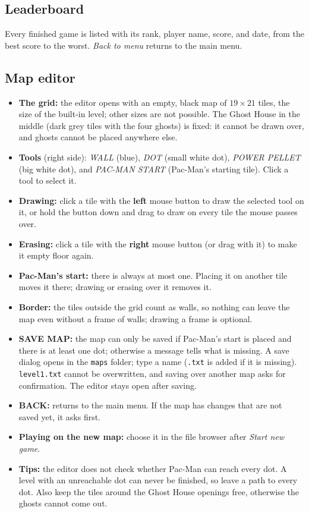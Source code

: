 \documentclass[11pt, a4paper]{article}
\begin{document}
\subsection*{Leaderboard}
Every finished game is listed with its rank, player name, score, and date, from the best score to the worst. \textit{Back to menu} returns to the main menu.

\subsection*{Map editor}
\begin{itemize}
    \item \textbf{The grid:} the editor opens with an empty, black map of $19 \times 21$ tiles, the size of the built-in level; other sizes are not possible. The Ghost House in the middle (dark grey tiles with the four ghosts) is fixed: it cannot be drawn over, and ghosts cannot be placed anywhere else.
    \item \textbf{Tools} (right side): \textit{WALL} (blue), \textit{DOT} (small white dot), \textit{POWER PELLET} (big white dot), and \textit{PAC-MAN START} (Pac-Man's starting tile). Click a tool to select it.
    \item \textbf{Drawing:} click a tile with the \textbf{left} mouse button to draw the selected tool on it, or hold the button down and drag to draw on every tile the mouse passes over.
    \item \textbf{Erasing:} click a tile with the \textbf{right} mouse button (or drag with it) to make it empty floor again.
    \item \textbf{Pac-Man's start:} there is always at most one. Placing it on another tile moves it there; drawing or erasing over it removes it.
    \item \textbf{Border:} the tiles outside the grid count as walls, so nothing can leave the map even without a frame of walls; drawing a frame is optional.
    \item \textbf{SAVE MAP:} the map can only be saved if Pac-Man's start is placed and there is at least one dot; otherwise a message tells what is missing. A save dialog opens in the \texttt{maps} folder; type a name (\texttt{.txt} is added if it is missing). \texttt{level1.txt} cannot be overwritten, and saving over another map asks for confirmation. The editor stays open after saving.
    \item \textbf{BACK:} returns to the main menu. If the map has changes that are not saved yet, it asks first.
    \item \textbf{Playing on the new map:} choose it in the file browser after \textit{Start new game}.
    \item \textbf{Tips:} the editor does not check whether Pac-Man can reach every dot. A level with an unreachable dot can never be finished, so leave a path to every dot. Also keep the tiles around the Ghost House openings free, otherwise the ghosts cannot come out.
\end{itemize}
\end{document}
